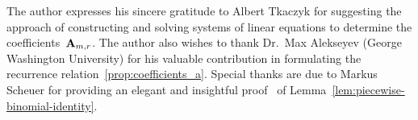 The author expresses his sincere gratitude to Albert Tkaczyk for suggesting the approach of constructing and solving
systems of linear equations to determine the coefficients~${\mathbf{A}} \sb{m,r}$.
The author also wishes to thank Dr.~Max Alekseyev (George Washington University)
for his valuable contribution in formulating the recurrence relation~\eqref{prop:coefficients_a}.
Special thanks are due to Markus Scheuer for providing an elegant and insightful
proof~\cite{scheuer2023mathstackexchange} of Lemma~\eqref{lem:piecewise-binomial-identity}.
